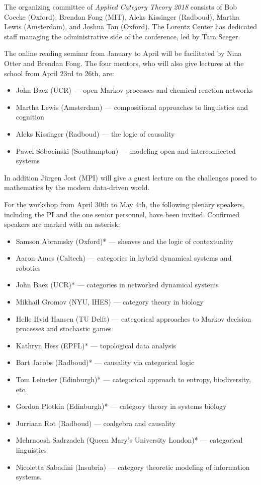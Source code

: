 \documentclass[12pt]{amsart}
\begin{document}
The organizing committee of \textsl{Applied Category Theory 2018} 
consists of Bob Coecke (Oxford), Brendan Fong (MIT),
Aleks Kissinger (Radboud), Martha Lewis (Amsterdam), and Joshua Tan (Oxford).
The Lorentz Center has dedicated staff managing the administrative side of
the conference, led by Tara Seeger.

The online reading seminar from January to April will be facilitated by Nina Otter and Brendan Fong.  The four mentors, who will also give lectures at the school
from April 23rd to 26th, are:

\begin{itemize}
\item 
John Baez (UCR) --- open Markov processes and chemical reaction networks
\item 
Martha Lewis (Amsterdam) --- compositional approaches to linguistics and cognition
\item
Aleks Kissinger (Radboud) --- the logic of causality
\item 
Pawel Sobocinski (Southampton) --- modeling open and interconnected systems
\end{itemize}
In addition J\"urgen Jost (MPI) will give a guest lecture on the challenges posed to mathematics by the modern data-driven world.

For the workshop from April 30th to May 4th, the following plenary speakers, including the PI and the one senior personnel, have been invited.   Confirmed speakers are marked with an asterisk:

\begin{itemize}
\item Samson Abramsky (Oxford)* --- sheaves and the logic of contextuality
\item Aaron Ames (Caltech) --- categories in hybrid dynamical systems and robotics
\item John Baez (UCR)* --- categories in networked dynamical systems
\item Mikhail Gromov (NYU, IHES) --- category theory in biology
\item Helle Hvid Hansen (TU Delft) --- categorical approaches to Markov decision processes and stochastic games
\item Kathryn Hess (EPFL)* --- topological data analysis
\item Bart Jacobs (Radboud)* --- causality via categorical logic
\item Tom Leinster (Edinburgh)* --- categorical approach to entropy, biodiversity, etc.
\item Gordon Plotkin (Edinburgh)* --- category theory in systems biology
\item Jurriaan Rot (Radboud) --- coalgebra and causality
\item Mehrnoosh Sadrzadeh (Queen Mary's University London)* --- categorical linguistics
\item Nicoletta Sabadini (Insubria) --- category theoretic modeling of information systems.
\end{itemize}
\end{document}
